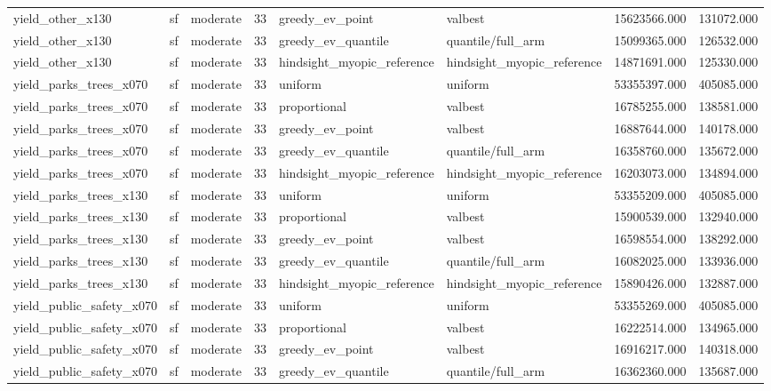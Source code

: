\begin{tabular}{lllrllrr}
yield\_other\_x130 & sf & moderate & 33 & greedy\_ev\_point & valbest & 15623566.000 & 131072.000 \\
yield\_other\_x130 & sf & moderate & 33 & greedy\_ev\_quantile & quantile/full\_arm & 15099365.000 & 126532.000 \\
yield\_other\_x130 & sf & moderate & 33 & hindsight\_myopic\_reference & hindsight\_myopic\_reference & 14871691.000 & 125330.000 \\
yield\_parks\_trees\_x070 & sf & moderate & 33 & uniform & uniform & 53355397.000 & 405085.000 \\
yield\_parks\_trees\_x070 & sf & moderate & 33 & proportional & valbest & 16785255.000 & 138581.000 \\
yield\_parks\_trees\_x070 & sf & moderate & 33 & greedy\_ev\_point & valbest & 16887644.000 & 140178.000 \\
yield\_parks\_trees\_x070 & sf & moderate & 33 & greedy\_ev\_quantile & quantile/full\_arm & 16358760.000 & 135672.000 \\
yield\_parks\_trees\_x070 & sf & moderate & 33 & hindsight\_myopic\_reference & hindsight\_myopic\_reference & 16203073.000 & 134894.000 \\
yield\_parks\_trees\_x130 & sf & moderate & 33 & uniform & uniform & 53355209.000 & 405085.000 \\
yield\_parks\_trees\_x130 & sf & moderate & 33 & proportional & valbest & 15900539.000 & 132940.000 \\
yield\_parks\_trees\_x130 & sf & moderate & 33 & greedy\_ev\_point & valbest & 16598554.000 & 138292.000 \\
yield\_parks\_trees\_x130 & sf & moderate & 33 & greedy\_ev\_quantile & quantile/full\_arm & 16082025.000 & 133936.000 \\
yield\_parks\_trees\_x130 & sf & moderate & 33 & hindsight\_myopic\_reference & hindsight\_myopic\_reference & 15890426.000 & 132887.000 \\
yield\_public\_safety\_x070 & sf & moderate & 33 & uniform & uniform & 53355269.000 & 405085.000 \\
yield\_public\_safety\_x070 & sf & moderate & 33 & proportional & valbest & 16222514.000 & 134965.000 \\
yield\_public\_safety\_x070 & sf & moderate & 33 & greedy\_ev\_point & valbest & 16916217.000 & 140318.000 \\
yield\_public\_safety\_x070 & sf & moderate & 33 & greedy\_ev\_quantile & quantile/full\_arm & 16362360.000 & 135687.000 \\

\end{tabular}

